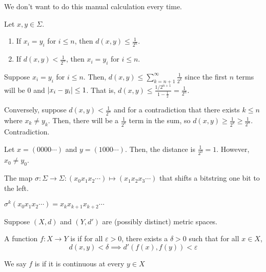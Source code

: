 \documentclass[class=pmath370,tikz,notes]{agony}
\begin{document}
We don't want to do this manual calculation every time.

\begin{prop}\label{prop:bsd}
  Let $x,y \in \Sigma$.
  \begin{enumerate}[nosep]
    \item If $x_i = y_i$ for $i \leq n$, then $d(x,y) \leq \frac{1}{2^n}$.
    \item If $d(x,y) < \frac{1}{2^n}$, then $x_i = y_i$ for $i \leq n$.
  \end{enumerate}
\end{prop}
\begin{prf}
  Suppose $x_i = y_i$ for $i \leq n$.
  Then, $d(x,y) \leq \sum_{k=n+1}^\infty \frac{1}{2^k}$
  since the first $n$ terms will be 0 and $\abs{x_i-y_i} \leq 1$.
  That is, $d(x,y) \leq \frac{1/2^{n+1}}{1-\frac12} = \frac{1}{2^n}$.

  Conversely, suppose $d(x,y) < \frac{1}{2^n}$
  and for a contradiction that there exists $k \leq n$ where $x_k \neq y_k$.
  Then, there will be a $\frac{1}{2^k}$ term in the sum,
  so $d(x,y) \geq \frac{1}{2^k} \geq \frac{1}{2^n}$. Contradiction.
\end{prf}

\begin{example}
  Let $x = (0000\cdots)$ and $y = (1000\cdots)$.
  Then, the distance is $\frac{1}{2^0} = 1$.
  However, $x_0 \neq y_0$.
\end{example}

\begin{defn}
  The map $\sigma : \Sigma \to \Sigma : (x_0x_1x_2\cdots) \mapsto (x_1x_2x_3\cdots)$
  that shifts a bitstring one bit to the left.
\end{defn}

\begin{remark}
  $\sigma^k(x_0x_1x_2\cdots) = x_k x_{k+1}x_{k+2} \cdots$
\end{remark}

\begin{defn*}
  Suppose $(X,d)$ and $(Y,d')$ are (possibly distinct) metric spaces.

  A function $f : X \to Y$ is 
  if for all $\varepsilon > 0$, there exists a $\delta > 0$
  such that for all $x \in X$,
  \[ d(x,y) < \delta \implies d'(f(x),f(y)) < \varepsilon \]

  We say $f$ is  if it is continuous at every $y \in X$
\end{defn*}
\end{document}

